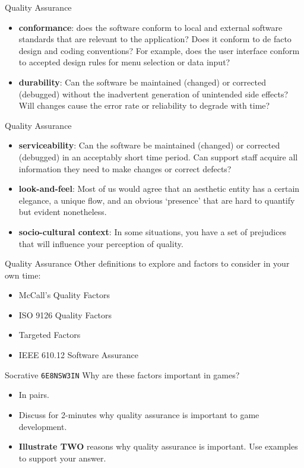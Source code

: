 \begin{frame}{Quality Assurance}
    \begin{itemize}
		\item \textbf{conformance}: does the software conform to local and external software standards that are relevant to the 
		application? Does it conform to de facto design and coding conventions? For example, does the user interface conform to accepted 
		design rules for menu selection or data input? \pause
		\item \textbf{durability}: Can the software be maintained (changed) or corrected (debugged) without the inadvertent generation 
		of unintended side effects? Will changes cause the error rate or reliability to degrade with time? 
    \end{itemize}
\end{frame}

\begin{frame}{Quality Assurance}
    \begin{itemize}
		\item \textbf{serviceability}: Can the software be maintained (changed) or corrected (debugged) in an acceptably short time period. 
		Can support staff acquire all information they need to make changes or correct defects? \pause
		\item \textbf{look-and-feel}: Most of us would agree that an aesthetic entity has a certain elegance, a unique flow, and an obvious 
		`presence' that are hard to quantify but evident nonetheless. \pause
		\item \textbf{socio-cultural context}: In some situations, you have a set of prejudices that will influence your perception of quality. 
	\end{itemize}
\end{frame}

\begin{frame}{Quality Assurance}
Other definitions to explore and factors to consider in your own time:

    \begin{itemize}
        \item McCall's Quality Factors
        \item ISO 9126 Quality Factors
        \item Targeted Factors
        \item IEEE 610.12 Software Assurance
    \end{itemize}
\end{frame}

\begin{frame}{Socrative \texttt{6E8NSW3IN}}
	Why are these factors important in games?
	
	\begin{itemize}
		\item In pairs.
		\item Discuss for 2-minutes why quality assurance is important to game development.
		\item \textbf{Illustrate TWO} reasons why quality assurance is important. Use examples to support your answer. 
	\end{itemize}
\end{frame}

